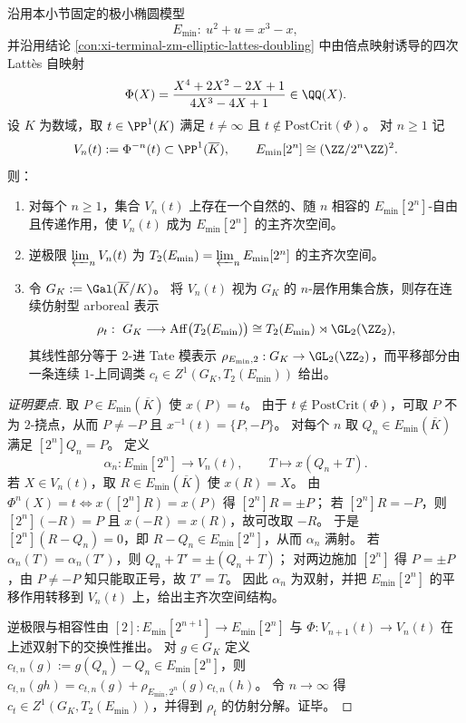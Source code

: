 \begin{theorem}\label{thm:conclusion-leyang-lattes-preimage-torsor-affine-galois}
沿用本小节固定的极小椭圆模型
\[
E_{\min}:\ u^2+u=x^3-x,
\]
并沿用结论 \ref{con:xi-terminal-zm-elliptic-lattes-doubling} 中由倍点映射诱导的四次 Latt\`es 自映射
\[
\Phi(X)=\frac{X^4+2X^2-2X+1}{4X^3-4X+1}\in\QQ(X).
\]
设 \(K\) 为数域，取 \(t\in\PP^1(K)\) 满足 \(t\neq \infty\) 且 \(t\notin \mathrm{PostCrit}(\Phi)\)。
对 \(n\ge 1\) 记
\[
V_n(t):=\Phi^{-n}(t)\subset \PP^1(\overline K),
\qquad
E_{\min}[2^n]\cong (\ZZ/2^n\ZZ)^2.
\]
则：
\begin{enumerate}
  \item 对每个 \(n\ge 1\)，集合 \(V_n(t)\) 上存在一个自然的、随 \(n\) 相容的 \(E_{\min}[2^n]\)-自由且传递作用，使 \(V_n(t)\) 成为 \(E_{\min}[2^n]\) 的主齐次空间。
  \item 逆极限 \(\varprojlim_n V_n(t)\) 为 \(T_2(E_{\min})=\varprojlim_n E_{\min}[2^n]\) 的主齐次空间。
  \item 令 \(G_K:=\Gal(\overline K/K)\)。
  将 \(V_n(t)\) 视为 \(G_K\) 的 \(n\)-层作用集合族，则存在连续仿射型 arboreal 表示
  \[
  \rho_t:\ G_K\longrightarrow \mathrm{Aff}\bigl(T_2(E_{\min})\bigr)\cong T_2(E_{\min})\rtimes \GL_2(\ZZ_2),
  \]
  其线性部分等于 \(2\)-进 Tate 模表示 \(\rho_{E_{\min},2}:G_K\to \GL_2(\ZZ_2)\)，而平移部分由一条连续 \(1\)-上同调类 \(c_t\in Z^1(G_K,T_2(E_{\min}))\) 给出。
\end{enumerate}
\end{theorem}
\begin{proof}[证明要点]
取 \(P\in E_{\min}(\overline K)\) 使 \(x(P)=t\)。
由于 \(t\notin \mathrm{PostCrit}(\Phi)\)，可取 \(P\) 不为 \(2\)-挠点，从而 \(P\neq -P\) 且 \(x^{-1}(t)=\{P,-P\}\)。
对每个 \(n\) 取 \(Q_n\in E_{\min}(\overline K)\) 满足 \([2^n]Q_n=P\)。
定义
\[
\alpha_n:E_{\min}[2^n]\to V_n(t),\qquad T\longmapsto x(Q_n+T).
\]
若 \(X\in V_n(t)\)，取 \(R\in E_{\min}(\overline K)\) 使 \(x(R)=X\)。
由 \(\Phi^n(X)=t\iff x([2^n]R)=x(P)\) 得 \([2^n]R=\pm P\)；
若 \([2^n]R=-P\)，则 \([2^n](-R)=P\) 且 \(x(-R)=x(R)\)，故可改取 \(-R\)。
于是 \([2^n](R-Q_n)=0\)，即 \(R-Q_n\in E_{\min}[2^n]\)，从而 \(\alpha_n\) 满射。
若 \(\alpha_n(T)=\alpha_n(T')\)，则 \(Q_n+T'=\pm(Q_n+T)\)；
对两边施加 \([2^n]\) 得 \(P=\pm P\)，由 \(P\neq -P\) 知只能取正号，故 \(T'=T\)。
因此 \(\alpha_n\) 为双射，并把 \(E_{\min}[2^n]\) 的平移作用转移到 \(V_n(t)\) 上，给出主齐次空间结构。
\par
逆极限与相容性由 \([2]:E_{\min}[2^{n+1}]\to E_{\min}[2^n]\) 与 \(\Phi:V_{n+1}(t)\to V_n(t)\) 在上述双射下的交换性推出。
对 \(g\in G_K\) 定义
\(
c_{t,n}(g):=g(Q_n)-Q_n\in E_{\min}[2^n]
\)，则
\(
c_{t,n}(gh)=c_{t,n}(g)+\rho_{E_{\min},2^n}(g)c_{t,n}(h)
\)。
令 \(n\to\infty\) 得 \(c_t\in Z^1(G_K,T_2(E_{\min}))\)，并得到 \(\rho_t\) 的仿射分解。证毕。
\end{proof}

